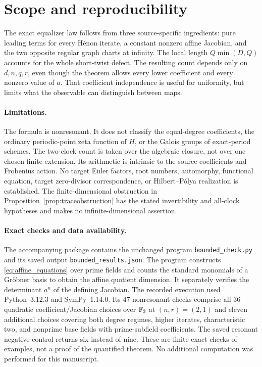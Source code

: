 \section{Scope and reproducibility}\label{sec:scope}

The exact equalizer law follows from three source-specific ingredients:
pure leading terms for every H\'enon iterate, a constant nonzero affine
Jacobian, and the two opposite regular graph charts at infinity. The
local length $Q\min(D,Q)$ accounts for the whole short-twist defect.
The resulting count depends only on $d,n,q,r$, even though the theorem
allows every lower coefficient and every nonzero value of $a$.
That coefficient independence is useful for uniformity, but limits
what the observable can distinguish between maps.

\paragraph{Limitations.}
The formula is nonresonant. It does not classify the equal-degree
coefficients, the ordinary periodic-point zeta function of $H$, or the
Galois groups of exact-period schemes. The two-clock count is taken over
the algebraic closure, not over one chosen finite extension. Its
arithmetic is intrinsic to the source coefficients and Frobenius action.
No target Euler factors, root numbers, automorphy, functional equation,
target zero-divisor correspondence, or Hilbert--P\'olya realization
is established. The finite-dimensional obstruction in
Proposition~\ref{prop:traceobstruction} has the stated invertibility
and all-clock hypotheses and makes no infinite-dimensional assertion.

\paragraph{Exact checks and data availability.}
The accompanying package contains the unchanged program
\texttt{bounded\_check.py} and its saved output
\texttt{bounded\_results.json}. The program constructs
\eqref{eq:affine_equations} over prime fields and counts the standard
monomials of a Gr\"obner basis to obtain the affine quotient dimension.
It separately verifies the determinant $a^n$ of the defining Jacobian.
The recorded execution used Python~3.12.3 and SymPy~1.14.0. Its 47
nonresonant checks comprise all 36 quadratic coefficient/Jacobian
choices over $\mathbb F_3$ at $(n,r)=(2,1)$ and eleven additional choices
covering both degree regimes, higher iterates, characteristic two,
and nonprime base fields with prime-subfield coefficients. The saved
resonant negative control returns six instead of nine. These are
finite exact checks of examples, not a proof of the quantified theorem.
No additional computation was performed for this manuscript.

